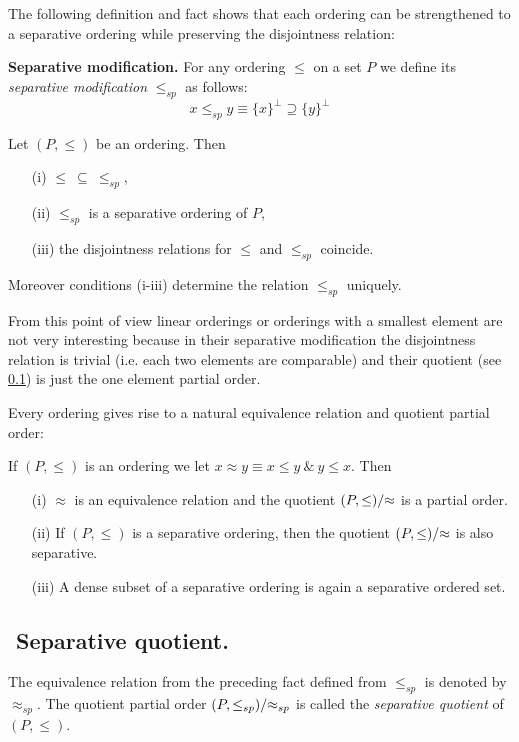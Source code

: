 The following definition and fact shows that each ordering can be strengthened to a separative ordering while preserving
the disjointness relation:

\begin{definition}\label{separative-modification}
{\bf Separative modification.} For any ordering $\leq$ on a set $P$ we define its \emph{separative modification}
$\leq_{sp}$ as follows:
$$ %
 x\leq_{sp} y \equiv \{x\}^\perp \supseteq\{y\}^\perp
$$ %
\end{definition}

\begin{fact} Let $(P,\leq)$ be an ordering. Then

 \begin{itemize}
  \item[(i)] $\leq\ \subseteq\ \leq_{sp}$,
  \item[(ii)] $\leq_{sp}$ is a separative ordering of $P$,
  \item[(iii)]  the disjointness relations for $\leq$ and $\leq_{sp}$ coincide.
 \end{itemize}
 Moreover conditions (i-iii) determine the relation $\leq_{sp}$ uniquely.
\end{fact}

From this point of view linear orderings or orderings with a smallest element are not very interesting because
in their separative modification the disjointness relation is trivial (i.e. each two elements are comparable)
and their quotient (see \ref{separative-quotient}) is just the one element partial order.

Every ordering gives rise to a natural equivalence relation and quotient partial order:

 \begin{fact} If $(P,\leq)$ is an ordering we let $x\approx y\equiv x\leq y\ \&\ y\leq x$. Then
 \begin{itemize}
 \item[(i)]  $\approx$ is an equivalence relation and the quotient $(P,\leq)/\hskip-1mm\approx$ is a partial order.
 \item[(ii)]  If $(P,\leq)$ is a separative ordering, then the quotient $(P,\leq)/\hskip-1mm\approx$ is also separative.
 \item[(iii)]  A dense subset of a separative ordering is again a separative ordered set.
\end{itemize}
\end{fact}


\subsection{${}$ \hspace{-1em}Separative quotient.}\label{separative-quotient}
The equivalence relation from the preceding fact defined from $\leq_{sp}$ is denoted by $\approx_{sp}$. The
quotient partial order $(P,\leq_{sp})/\hskip-1mm\approx_{sp}$ is called the \emph{separative quotient} of $(P,\leq)$.

